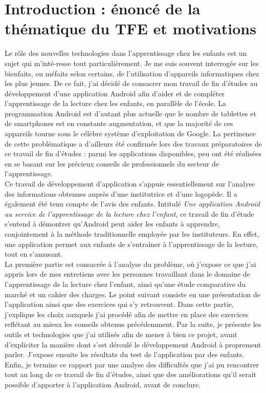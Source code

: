 \section{Introduction : énoncé de la thématique du TFE et motivations}
Le rôle des nouvelles technologies dans l'apprentissage chez les enfants est un sujet qui m'inté-resse tout particulièrement. Je me suis souvent interrogée sur les bienfaits, ou méfaits selon certains, de l'utilisation d'appareils informatiques chez les plus jeunes. De ce fait, j'ai décidé de consacrer mon travail de fin d'études au développement d'une application Android afin d'aider et de compléter l'apprentissage de la lecture chez les enfants, en parallèle de l'école. La programmation Android est d'autant plus actuelle que le nombre de tablettes et de smartphones est en constante augmentation, et que la majorité de ces appareils tourne sous le célèbre système d'exploitation de Google. La pertinence de cette problématique a d'ailleurs été confirmée lors des travaux préparatoires de ce travail de fin d'études : parmi les applications disponibles, peu ont été réalisées en se basant sur les précieux conseils de professionnels du secteur de l'apprentissage.\\

Ce travail de développement d'application s'appuie essentiellement sur l'analyse des informations obtenues auprès d'une institutrice et d'une logopède. Il a également été tenu compte de l'avis des enfants. Intitulé \textit{Une application Android au service de l'apprentissage de la lecture chez l'enfant}, ce travail de fin d'étude s'entend à démontrer qu'Android peut aider les enfants à apprendre, conjointement à la méthode traditionnelle employée par les instituteurs. En effet, une application permet aux enfants de s'entraîner à l'apprentissage de la lecture, tout en s'amusant.\\

La première partie est consacrée à l'analyse du problème, où j'expose ce que j'ai appris lors de mes entretiens avec les personnes travaillant dans le domaine de l'apprentissage de la lecture chez l'enfant, ainsi qu'une étude comparative du marché et un cahier des charges. Le point suivant consiste en une présentation de l'application ainsi que des exercices qui s'y retrouvent. Dans cette partie, j'explique les choix auxquels j'ai procédé afin de mettre en place des exercices reflétant au mieux les conseils obtenus précédemment. Par la suite, je présente les outils et technologies que j'ai utilisés afin de mener à bien ce projet, avant d'expliciter la manière dont s'est déroulé le développement Android à proprement parler. J'expose ensuite les résultats du test de l'application par des enfants. Enfin, je termine ce rapport par une analyse des difficultés que j'ai pu rencontrer tout au long de ce travail de fin d'études, ainsi que des améliorations qu'il serait possible d'apporter à l'application Android, avant de conclure.